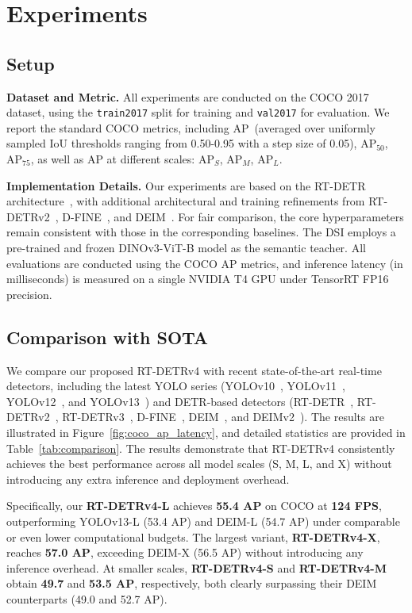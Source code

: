\section{Experiments}

\subsection{Setup}
\noindent \textbf{Dataset and Metric.} 
All experiments are conducted on the COCO 2017~\cite{lin2014microsoft} dataset, using the \texttt{train2017} split for training and \texttt{val2017} for evaluation. We report the standard COCO metrics, including AP~(averaged over uniformly sampled IoU thresholds ranging from 0.50-0.95 with a step size of 0.05), AP$_{50}$, AP$_{75}$, as well as AP at different scales: AP$_S$, AP$_M$, AP$_L$.

\noindent \textbf{Implementation Details.}
Our experiments are based on the RT-DETR architecture~\cite{zhao2024detrs}, with additional architectural and training refinements from RT-DETRv2~\cite{lv2024rt}, D-FINE~\cite{peng2024d}, and DEIM~\cite{huang2025deim}. For fair comparison, the core hyperparameters remain consistent with those in the corresponding baselines. 
The DSI employs a pre-trained and frozen DINOv3-ViT-B model as the semantic teacher. All evaluations are conducted using the COCO AP metrics, and inference latency (in milliseconds) is measured on a single NVIDIA T4 GPU under TensorRT FP16 precision.


\subsection{Comparison with SOTA}
We compare our proposed {RT-DETRv4} with recent state-of-the-art real-time detectors, including the latest YOLO series (YOLOv10~\cite{wang2024yolov10}, YOLOv11~\cite{yolo11}, YOLOv12~\cite{tian2025yolov12}, and YOLOv13~\cite{lei2025yolov13}) and DETR-based detectors (RT-DETR~\cite{zhao2024detrs}, RT-DETRv2~\cite{lv2024rt}, RT-DETRv3~\cite{wang2025rt}, D-FINE~\cite{peng2024d}, DEIM~\cite{huang2025deim}, and DEIMv2~\cite{huang2025real}). The results are illustrated in Figure~\ref{fig:coco_ap_latency}, and detailed statistics are provided in Table~\ref{tab:comparison}.
The results demonstrate that {RT-DETRv4} consistently achieves the best performance across all model scales (S, M, L, and X) without introducing any extra inference and deployment overhead.

Specifically, our \textbf{RT-DETRv4-L} achieves \textbf{55.4 AP} on COCO at \textbf{124 FPS}, outperforming YOLOv13-L (53.4 AP) and DEIM-L (54.7 AP) under comparable or even lower computational budgets.
The largest variant, \textbf{RT-DETRv4-X}, reaches \textbf{57.0 AP}, exceeding DEIM-X (56.5 AP) without introducing any inference overhead.
At smaller scales, \textbf{RT-DETRv4-S} and \textbf{RT-DETRv4-M} obtain \textbf{49.7} and \textbf{53.5 AP}, respectively, both clearly surpassing their DEIM counterparts (49.0 and 52.7 AP). 

